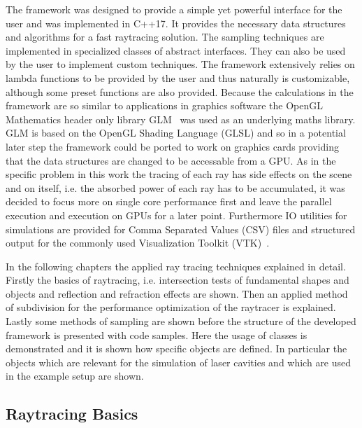 \documentclass[a4paper,10pt]{article}
\begin{document}
    The framework was designed to provide a simple yet powerful
    interface for the user and was implemented in C++17.
    It provides the necessary data structures and algorithms for
    a fast raytracing solution.
    The sampling techniques are implemented in specialized classes
    of abstract interfaces. 
    They can also be used by the user to 
    implement custom techniques.
    The framework extensively relies on lambda functions to be
    provided by the user and thus naturally is customizable,
    although some preset functions are also provided.
    Because the calculations in the framework are so similar to applications
    in graphics software the OpenGL Mathematics header only library
    GLM~\cite{glm} was used as an underlying maths library.
    GLM is based on the OpenGL Shading Language (GLSL) and so in a 
    potential later step the framework
    could be ported to work on graphics cards providing that the
    data structures are changed to be accessable from a GPU.
    As in the specific problem in this work the tracing of each ray
    has side effects on the scene and on itself,
    i.e. the absorbed power of each ray has to be accumulated,
    it was decided to focus more on single core performance first
    and leave the parallel execution and execution on GPUs for a 
    later point.
    Furthermore IO utilities for simulations are provided for Comma 
    Separated Values (CSV) files and structured output for the 
    commonly used Visualization Toolkit (VTK)~\cite{vtk}.

    In the following chapters the applied ray tracing techniques 
    explained in detail.
    Firstly the basics of raytracing, i.e. intersection tests of
    fundamental shapes and objects and reflection and refraction effects
    are shown.
    Then an applied method of subdivision for the performance optimization
    of the raytracer is explained.
    Lastly some methods of sampling are shown before the structure of the 
    developed framework is presented with code samples.
    Here the usage of classes is demonstrated and it is shown how specific
    objects are defined.
    In particular the objects which are relevant for the simulation
    of laser cavities and which are used in the example setup are shown.

    \subsection{Raytracing Basics}  \label{sec:raytracing_basics}
\end{document}
